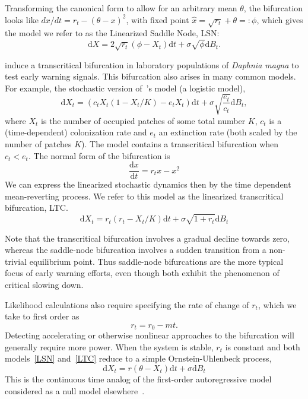 \documentclass[authoryear,preprint,11pt]{elsarticle}
\newcommand{\ud}{\mathrm{d}}
\begin{document}
Transforming the canonical form to allow for an arbitrary mean $\theta$,
the bifurcation looks like $ dx/dt = r_t- (\theta-x)^2 $, with fixed point $\hat x = \sqrt{r_t} +\theta =: \phi$,
which gives the model we refer to as the Linearized Saddle Node, LSN: 
\begin{equation}
\ud X = 2\sqrt{ r_t } (\phi - X_t)\ud t + \sigma\sqrt{\phi } \ud B_t. \label{LSN}
\end{equation}

\citet{Drake2010} induce a transcritical bifurcation in laboratory populations of \emph{Daphnia magna} to test early warning signals.  
This bifurcation also arises in many common models.  For example, the stochastic version of~\citet{Levins1969}'s model (a logistic model),
\begin{equation}
\ud X_t = \left( c_t X_t (1-X_t/K) - e_t X_t \right) \ud t + \sigma \sqrt{\frac{e_t}{c_t}} \ud B_t \label{levins},
\end{equation}
where $X_t$ is the number of occupied patches of some total number $K$, $c_t$ is a (time-dependent)
colonization rate and $e_t$ an extinction rate (both scaled by the number of patches $K$).  
The model contains a transcritical bifurcation when $c_t < e_t$.  The normal form of the bifurcation is
\begin{equation}
\frac{\ud x}{\ud t} = r_t x - x^2 
\label{transcritical}
\end{equation}
We can express the linearized stochastic dynamics then by the time dependent mean-reverting process. 
We refer to this model as the linearized transcritical bifurcation, LTC.  
\begin{equation}
\ud X_t = r_t (r_t - X_t/K) \ud t + \sigma \sqrt{1+r_t} \ud B_t \label{LTC}
\end{equation}

Note that the transcritical bifurcation involves a gradual decline towards zero,
whereas the saddle-node bifurcation involves a sudden transition from a non-trivial equilibrium point.
Thus saddle-node bifurcations are the more typical focus of early warning efforts, even though both exhibit the phenomenon of critical slowing down.

Likelihood calculations also require specifying the rate of change of $r_t$, 
which we take to first order as
\begin{equation}
r_t = r_0 - m t.
\label{R_t}
\end{equation}
Detecting accelerating or otherwise nonlinear approaches to the bifurcation will generally require more power. When the system is stable, $r_t$ is constant and both models~\eqref{LSN} and~\eqref{LTC} reduce to a simple Ornstein-Uhlenbeck process, 
\begin{equation}
\ud X_t = r (\theta - X_t) \ud t + \sigma \ud B_t \label{OU}
\end{equation}
This is the continuous time analog of the first-order autoregressive model considered as a null model elsewhere~\citep[\emph{e.g.}][]{Dakos2008, Guttal2008a}. 
\end{document}
